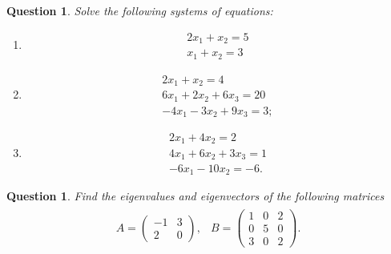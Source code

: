 \documentclass[12pt]{article}
\newtheorem{ques}[theorem]{Question}
\begin{document}
\newpage
\begin{ques}
Solve the following systems of equations:
\begin{enumerate}
    \item \begin{align*}
    2x_1+x_2=5\\ x_1+x_2=3
\end{align*}
\item \begin{align*}
    2x_1+x_2=4\\
    6x_1+2x_2+6x_3=20\\
    -4x_1-3x_2+9x_3=3;
\end{align*}
\item \begin{align*}
    2x_1+4x_2=2\\
    4x_1+6x_2+3x_3=1\\
    -6x_1-10x_2=-6.
\end{align*}
\end{enumerate}
\end{ques}
\newpage
\begin{ques}
Find the eigenvalues and eigenvectors of the following matrices
\begin{align*}
\begin{array}{cc}
  A=  \begin{pmatrix}
    -1& 3\\
    2&0
    \end{pmatrix},
&  B=\begin{pmatrix} 
1 & 0& 2\\
0& 5& 0\\
3 &0 &2
\end{pmatrix}.
\end{array}
\end{align*}
\end{ques}
\end{document}
